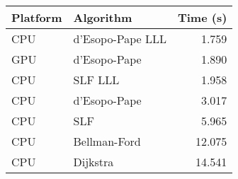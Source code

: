 \begin{tabular}{llr}
  \hline
  Platform & Algorithm & Time (s) \\
  \hline
  CPU & d'Esopo-Pape LLL & 1.759 \\
  GPU & d'Esopo-Pape & 1.890 \\
  CPU & SLF LLL & 1.958 \\
  CPU & d'Esopo-Pape & 3.017 \\
  CPU & SLF & 5.965 \\
  CPU & Bellman-Ford & 12.075 \\
  CPU & Dijkstra & 14.541 \\
  \hline
\end{tabular}
